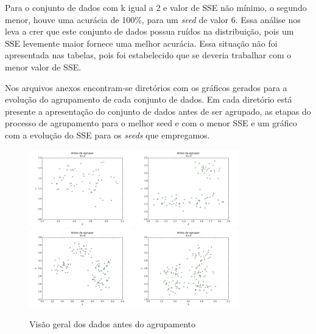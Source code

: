\documentclass[12pt, a4paper]{article}
\begin{document}
Para o conjunto de dados com k igual a 2 e valor de SSE não mínimo, o segundo menor, houve uma acurácia de 100\%, para um \emph{seed} de valor 6. Essa análise nos leva a crer que este conjunto de dados possua ruídos na distribuição, pois um SSE levemente maior fornece uma melhor acurácia. Essa situação não foi apresentada nas tabelas, pois foi estabelecido que se deveria trabalhar com o menor valor de SSE.

Nos arquivos anexos encontram-se diretórios com os gráficos gerados para a evolução do agrupamento de cada conjunto de dados. Em cada diretório está presente a apresentação do conjunto de dados antes de ser agrupado, as etapas do processo de agrupamento para o melhor seed e com o menor SSE e um gráfico com a evolução do SSE para os \emph{seeds} que empregamos.

\begin{landscape}
\begin{figure}[!ht]
  \caption{Visão geral dos dados antes do agrupamento}
  \label{antes}
  \centering
    \includegraphics[width=0.4\textwidth]{antes_k2.png}
    \includegraphics[width=0.4\textwidth]{antes_k3.png}
    \includegraphics[width=0.4\textwidth]{antes_k4.png}
    \includegraphics[width=0.4\textwidth]{antes_k5.png}

\end{figure}
\end{landscape}
\end{document}
